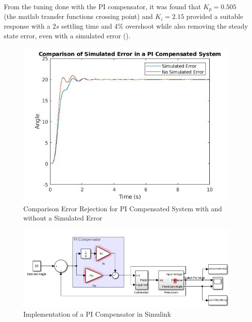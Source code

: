 \documentclass[a4paper, 11pt, compsoc]{IEEEtran}
\begin{document}
			\par
			From the tuning done with the PI compensator, it was found that $K_p = 0.505$ (the matlab transfer functions crossing point) and $K_i = 2.15$ provided a suitable response with a $2 s$ settling time and $4\%$ overshoot while also removing the steady state error, even with a simulated error (). 
			\begin{figure}[!ht]
				\centering
				\includegraphics[width=\columnwidth]{PI_Error.jpg}
				\caption{Comparison Error Rejection for PI Compensated System with and without a Simulated Error}
				\label{fig:PI_Error}
			\end{figure}

			\begin{figure}[!ht]
				\centering
				\includegraphics[width=\columnwidth]{piSys.png}
				\caption{Implementation of a PI Compensator in Simulink}
				\label{fig:piSys}
			\end{figure}
\end{document}
